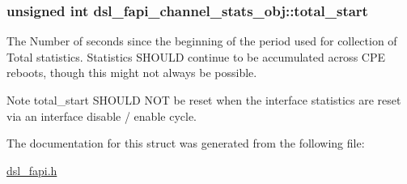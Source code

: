 \hypertarget{structdsl__fapi__channel__stats__obj_a40d5d021d50f908b763acf052b70d532}{
\subsubsection[{total\-\_\-start}]{\setlength{\rightskip}{0pt plus 5cm}unsigned int dsl\-\_\-fapi\-\_\-channel\-\_\-stats\-\_\-obj\-::total\-\_\-start}}\label{structdsl__fapi__channel__stats__obj_a40d5d021d50f908b763acf052b70d532}
The Number of seconds since the beginning of the period used for collection of Total statistics. Statistics S\-H\-O\-U\-L\-D continue to be accumulated across C\-P\-E reboots, though this might not always be possible. \begin{DoxyNote}{Note}
total\-\_\-start S\-H\-O\-U\-L\-D N\-O\-T be reset when the interface statistics are reset via an interface disable / enable cycle. 
\end{DoxyNote}


The documentation for this struct was generated from the following file\-:\begin{DoxyCompactItemize}
\item 
\hyperlink{dsl__fapi_8h}{dsl\-\_\-fapi.\-h}\end{DoxyCompactItemize}
